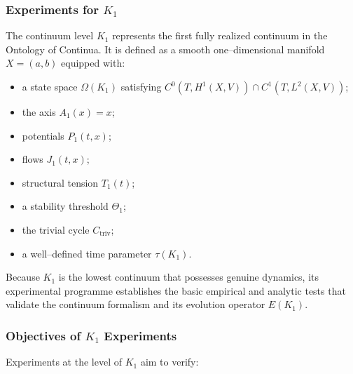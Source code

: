 
\subsubsection{Experiments for \texorpdfstring{$K_1$}{K_1}}
\label{sec:experiments-k1}

The continuum level $K_1$ represents the first fully realized continuum in
the Ontology of Continua.  
It is defined as a smooth one–dimensional manifold $X = (a,b)$ equipped with:
\begin{itemize}
    \item a state space $\Omega(K_1)$ satisfying 
          $C^0(T,H^1(X,V))\cap C^1(T,L^2(X,V))$;
    \item the axis $A_1(x)=x$;
    \item potentials $P_1(t,x)$;
    \item flows $J_1(t,x)$;
    \item structural tension $T_1(t)$;
    \item a stability threshold $\Theta_1$;
    \item the trivial cycle $C_{\mathrm{triv}}$;
    \item a well–defined time parameter $\tau(K_1)$.
\end{itemize}

Because $K_1$ is the lowest continuum that possesses genuine dynamics,  
its experimental programme establishes the basic empirical and analytic 
tests that validate the continuum formalism and its evolution operator 
$E(K_1)$.


\subsubsection{Objectives of \texorpdfstring{$K_1$}{K_1} Experiments}

Experiments at the level of $K_1$ aim to verify:

